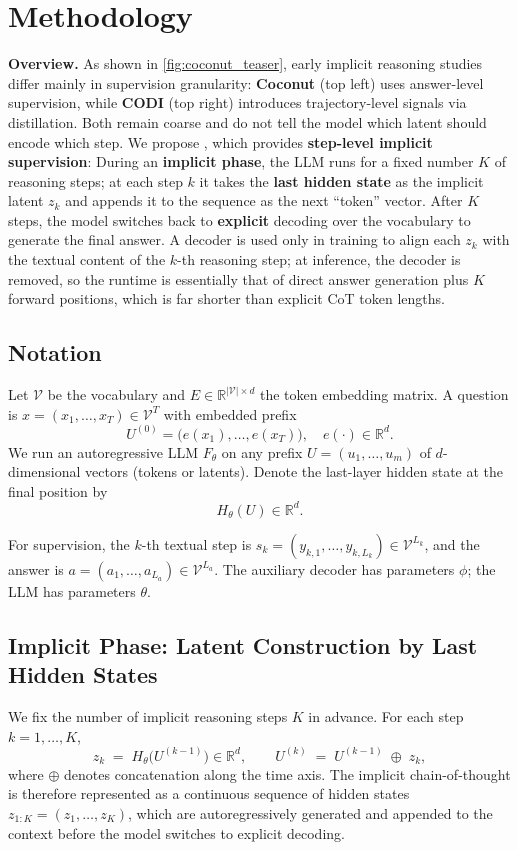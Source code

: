 \section{Methodology}


\noindent \textbf{Overview.}
As shown in \cref{fig:coconut_teaser}, early implicit reasoning studies differ mainly in supervision granularity:
\textbf{Coconut} (top left) uses answer-level supervision, while \textbf{CODI} (top right) introduces trajectory-level signals via distillation.
Both remain coarse and do not tell the model which latent should encode which step.
We propose \textbf{\methodname}, which provides \textbf{step-level implicit supervision}:
During an \textbf{implicit phase}, the LLM runs for a fixed number \(K\) of reasoning steps; at each step \(k\) it takes the \textbf{last hidden state} as the implicit latent \(z_k\) and appends it to the sequence as the next “token” vector.
After \(K\) steps, the model switches back to \textbf{explicit} decoding over the vocabulary to generate the final answer.
A decoder is used only in training to align each \(z_k\) with the textual content of the \(k\)-th reasoning step; at inference, the decoder is removed, so the runtime is essentially that of direct answer generation plus \(K\) forward positions, which is far shorter than explicit CoT token lengths.

\subsection{Notation}
Let \(\mathcal{V}\) be the vocabulary and \(E\in\mathbb{R}^{|\mathcal{V}|\times d}\) the token embedding matrix.
A question is \(x=(x_1,\ldots,x_T)\in\mathcal{V}^T\) with embedded prefix
\[
U^{(0)}=\big(e(x_1),\ldots,e(x_T)\big), \quad e(\cdot)\in\mathbb{R}^{d}.
\]
We run an autoregressive LLM \(F_\theta\) on any prefix \(U=(u_1,\ldots,u_m)\) of \(d\)-dimensional vectors (tokens or latents). 
Denote the last-layer hidden state at the final position by
\[
H_\theta(U)\in\mathbb{R}^{d}.
\]

For supervision, the \(k\)-th textual step is \(s_k=(y_{k,1},\ldots,y_{k,L_k})\in\mathcal{V}^{L_k}\), and the answer is \(a=(a_1,\ldots,a_{L_a})\in\mathcal{V}^{L_a}\).
The auxiliary decoder has parameters \(\phi\); the LLM has parameters \(\theta\).

\subsection{Implicit Phase: Latent Construction by Last Hidden States}
We fix the number of implicit reasoning steps \(K\) in advance. For each step \(k=1,\ldots,K\),
\begin{equation}
\label{eq:latent}
z_k \;=\; H_\theta\!\big(U^{(k-1)}\big) \in \mathbb{R}^{d}, 
\qquad
U^{(k)} \;=\; U^{(k-1)} \;\oplus\; z_k ,
\end{equation}
where \(\oplus\) denotes concatenation along the time axis. 
The implicit chain-of-thought is therefore represented as a continuous sequence of hidden states \(z_{1:K}=(z_1,\ldots,z_K)\), 
which are autoregressively generated and appended to the context before the model switches to explicit decoding.


